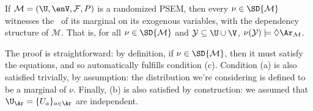 \begin{subappendices}
\begin{prop}
    If $\mathcal M = (
         \U,\enV,\mathcal F
        , P)$ is a randomized PSEM, then
    every $\nu \in \SD{\mathcal M}$ 
    witnesses
    the \scibility\ of its marginal on its exogenous variables, with the dependency structure of $\mathcal M$.
    That is,
    for all $\nu \in \SD{\cal M}$ 
    and $\mathcal Y \subseteq \U \cup \V$, 
    $\nu(\mathcal Y) \models \Diamond \Ar_{\cal M}$. 
\end{prop}

The proof is straightforward: by definition, if $\nu \in \SD{\cal M}$, 
then it must satisfy the equations, and so automatically fulfills condition (c). 
Condition (a) is also satisfied trivially, by assumption: the distribution we're considering is defined to be a marginal of $\nu$.
Finally, (b) is also satisfied by construction: we assumed that $\U_{\Ar} = \{ U_a \}_{a \in \Ar}$ are independent.

% 
%
\commentout{
}
\end{subappendices}
